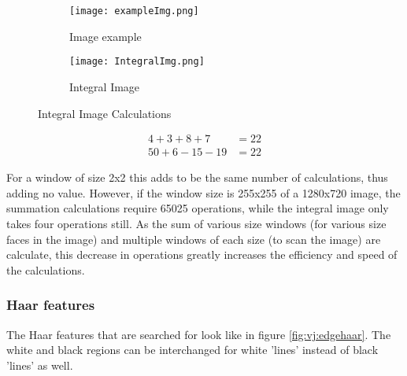 \documentclass{article}
\begin{document}
\begin{figure}[h]
    \begin{subfigure}{0.5\textwidth}
        \texttt{[image: exampleImg.png]} 
        \caption{Image example}
        \label{fig:vj:exm}
    \end{subfigure}
    \begin{subfigure}{0.5\textwidth}
        \texttt{[image: IntegralImg.png]}
        \caption{Integral Image}
        \label{fig:vj:int}
    \end{subfigure}
    \caption{Integral Image Calculations}
    \label{fig:vj:main}
\end{figure}

\begin{align}
    4 + 3 + 8 + 7 &= 22 \label{eq:vj:exm}\\
    50 + 6 - 15 - 19 &= 22 \label{eq:vj:intS}
\end{align}

  For a window of size 2x2 this adds to be the same number of calculations, thus adding no value.  However, if the window size is 255x255 of a 1280x720 image, the summation calculations require 65025 operations, while the integral image only takes four operations still.  As the sum of various size windows (for various size faces in the image) and multiple windows of each size (to scan the image) are calculate, this decrease in operations greatly increases the efficiency and speed of the calculations.

\subsubsection{Haar features}

The Haar features that are searched for look like in figure \ref{fig:vj:edgehaar}.  The white and black regions can be interchanged for white 'lines' instead of black 'lines' as well.
\end{document}
